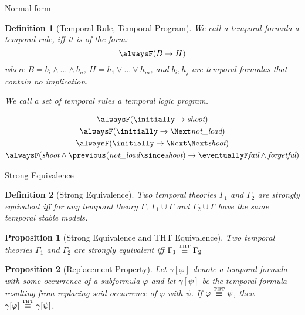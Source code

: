 \documentclass[aspectratio=169,xcolor=svgnames]{beamer}
\theoremstyle{theoremstyle_space}
\newtheorem{definition}{Definition}
\newtheorem{proposition}{Proposition}
\begin{document}
\begin{frame}{Normal form}
\begin{definition}[Temporal Rule, Temporal Program]
  We call a temporal formula a temporal rule, iff it is of the form:
  $$
  \tempruleshort
  $$
  where $B=b_i \land \dots \land b_n$, $H=h_1 \lor \dots \lor h_m$,
  and $b_i,h_j$ are temporal formulas that contain no implication.  

  We call a set of temporal rules a temporal logic program.
\end{definition}

\begin{equation*}
\begin{gathered}
\alwaysF (\initially \rightarrow \textit{shoot})\\
\alwaysF (\initially \rightarrow \Next\textit{not\_load})\\
\alwaysF (\initially \rightarrow \Next\Next\textit{shoot})\\
\alwaysF(\textit{shoot} \wedge \previous(\textit{not\_load} \since \textit{shoot})
\rightarrow \eventuallyF \textit{fail} \wedge \textit{forgetful})
\end{gathered}
\end{equation*}
\end{frame}

\begin{frame}{Strong Equivalence}

\begin{definition}[Strong Equivalence]
  Two temporal theories $\Gamma_1$ and $\Gamma_2$ are strongly
  equivalent iff for any temporal theory $\Gamma$,
  $\Gamma_1 \cup \Gamma$ and $\Gamma_2 \cup \Gamma$ have the same
  temporal stable models.
\end{definition}

\begin{proposition}[Strong Equivalence and THT Equivalence]
  Two temporal theories $\Gamma_1$ and $\Gamma_2$ are strongly equivalent
  iff $\Gamma_1 \stackrel{\normalfont\mbox{\tiny THT}}{\equiv} \Gamma_2$
\end{proposition}

\begin{proposition}[Replacement Property]
  Let $\gamma[\varphi]$ denote a temporal formula with some occurrence of a
  subformula $\varphi$ and let $\gamma[\psi]$ be the temporal formula resulting
  from replacing said occurrence of $\varphi$ with $\psi$. If
  $\varphi \stackrel{\normalfont\mbox{\tiny THT}}{\equiv} \psi$, then $\gamma[\varphi] \stackrel{\normalfont\mbox{\tiny THT}}{\equiv} \gamma[\psi]$.
\end{proposition}

\end{frame}
\end{document}
